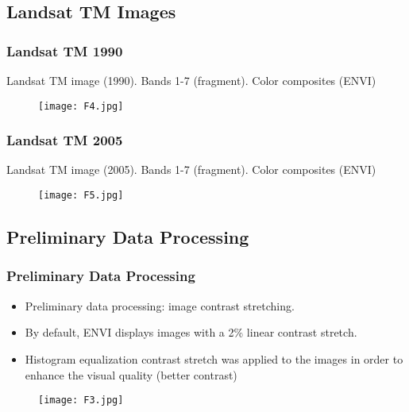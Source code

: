 \documentclass[pdflatex,compress,8pt,
	xcolor={dvipsnames,dvipsnames,svgnames,x11names,table},
	hyperref={	
	breaklinks = true, 
	pdfauthor={Lemenkova Polina}, 
	pdfsubject={Preentation}, 
	pdfcreator={Lemenkova Polina}, 
	pdfproducer={Lemenkova Polina}, 
	colorlinks=true,
	linkcolor=Gold1, 
	citecolor=NavyBlue, 
	urlcolor = NavyBlue, 
	breaklinks = true}]{beamer}
\begin{document}
\subsection{Landsat TM Images}
\begin{frame}\frametitle{Landsat TM 1990}
Landsat TM image (1990). Bands 1-7 (fragment). Color composites (ENVI)
\begin{figure}[H]
	\centering
		\texttt{[image: F4.jpg]}
\end{figure}
\end{frame}

\begin{frame}\frametitle{Landsat TM 2005}
Landsat TM image (2005). Bands 1-7 (fragment). Color composites (ENVI)
\begin{figure}[H]
	\centering
		\texttt{[image: F5.jpg]}
\end{figure}
\end{frame}

\subsection{Preliminary Data Processing}
\begin{frame}\frametitle{Preliminary Data Processing}
\begin{itemize}
	\item Preliminary data processing: image contrast stretching. 
	\item By default, ENVI displays images with a 2\% linear contrast stretch.
	\item Histogram equalization contrast stretch was applied to the images in order to enhance the visual quality (better contrast)
\end{itemize}
\begin{figure}[H]
	\centering
		\texttt{[image: F3.jpg]}
\end{figure}
\end{frame}
\end{document}
